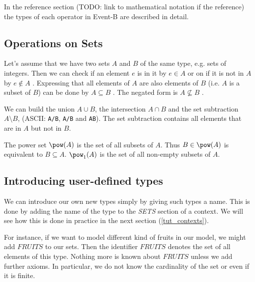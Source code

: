 
In the reference section (TODO: link to mathematical notation if the reference) the types of each operator in Event-B are described in detail.

\subsection{Operations on Sets}
\label{tut_operations_on_sets}
Let's assume that we have two sets $A$ and $B$ of the same type, e.g. sets of integers.
Then we can check if an element $e$ is in it by $e\in A$  or 
on if it is not in $A$ by $e\notin A$ .
Expressing that all elements of $A$ are also elements of $B$ (i.e. $A$ is a subset of $B$) can
be done by $A\subseteq B$ . The negated form is $A\not\subseteq B$ .

We can build the union $A\cup B$, the intersection $A\cap B$ and the set subtraction $A\setminus B$,
(ASCII: \texttt{A\mybackslash{}/B}, \texttt{A/\mybackslash{}B} and \texttt{A\mybackslash{}B}). The
set subtraction contains all elements that are in $A$ but not in $B$.

The power set $\pow(A)$  is the set of all subsets of $A$.
Thus $B\in\pow(A)$ is equivalent to $B\subseteq A$.
$\pow_1(A)$  is the set of all non-empty subsets of $A$.

\subsection{Introducing user-defined types}
\label{tut_user_defined_sets}

We can introduce our own new types simply by giving such types a name.
This is done by adding the name of the type to the \textsl{SETS} section of a context.
We will see how this is done in practice in the next section (\ref{tut_contexts}).

For instance, if we want to model different kind of fruits in our model, we might add $FRUITS$ to our
sets. Then the identifier $FRUITS$ denotes the set of all elements of this type. Nothing more is known about $FRUITS$ unless we add further axioms. In particular, we do not
know the cardinality of the set or even if it is finite.


